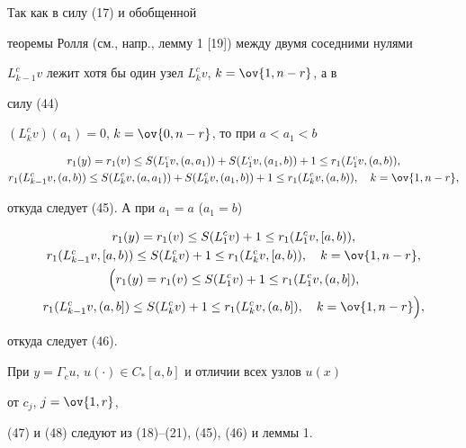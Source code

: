  


\begin{pf} Так как в силу (17) и обобщенной 


теоремы Ролля (см., напр., лемму 1 [19]) между двумя соседними нулями 


$L^c_{k-1}v$ лежит хотя бы один узел $L^c_k v$, $k=\ov{1,n-r}$, а в 


силу (44) 


$(L^c_k v)(a_1)=0$, $k=\ov 


{0,n-r}$, то при $a<a_1<b$ 


\begin{gather*}  


r_1(y)=r_1(v)\le S(L^c_1v,(a,a_1))+ 


S(L^c_1v,(a_1,b))+1\le r_1(L^c_1v,(a,b)),\\


r_1(L^c_{k-1}v,(a,b))\le S(L^c_k v,(a,a_1))+S(L^c_k v,(a_1,b))+1\le  


r_1(L^c_k v,(a,b)),\quad k=\ov{1,n-r}, 


\end{gather*}  


откуда следует (45). А при $a_1=a$ ($a_1=b$) 


\begin{gather*} 


r_1(y)=r_1(v)\le S(L^c_1v)+1\le r_1(L^c_1v,[a,b)),\\


r_1(L^c_{k-1}v,[a,b))\le S(L^c_k v)+1\le 


r_1(L^c_k v,[a,b)),\quad k=\ov{1,n-r},\\ 


% 


\Big(r_1(y)=r_1(v)\le S(L^c_1v)+1\le r_1 


(L^c_1v,(a,b]),\\


r_1(L^c_{k-1}v,(a,b])\le S(L^c_k v)+1\le r_1(L^c_k v,(a,b]),\quad 


k=\ov{1,n-r}\Big), 


\end{gather*} 


откуда следует (46). 


 


При $y=\Gamma_c u$, $u(\cdot)\in C_*[a,b]$ и отличии всех узлов $u(x)$ 


от $c_j$, $j=\ov{1,r}$, 


(47) и (48) следуют из (18)--(21), (45), (46) и леммы 1. 


\end{pf} 


